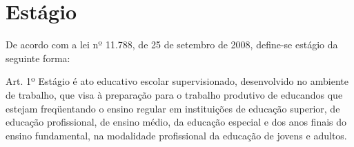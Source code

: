\section{Estágio}
De acordo com a lei nº 11.788, de 25 de setembro de 2008, define-se estágio da seguinte forma:

\begin{quoting}[rightmargin=0cm,leftmargin=4cm]
	\begin{SingleSpace}
	{\footnotesize
	Art. 1º  Estágio é ato educativo escolar supervisionado, desenvolvido no ambiente de trabalho, que visa à preparação para o trabalho produtivo de educandos que estejam freqüentando o ensino regular em instituições de educação superior, de educação profissional, de ensino médio, da educação especial e dos anos finais do ensino fundamental, na modalidade profissional da educação de jovens e adultos. \cite{leiestagio}
	}
	\end{SingleSpace}
\end{quoting}